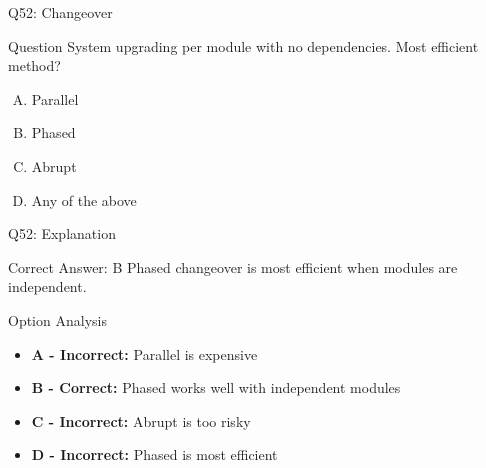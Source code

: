 \documentclass{beamer}
\begin{document}
	\begin{frame}{Q52:  Changeover}
		\begin{block}{Question}
			System upgrading per module with no dependencies. Most efficient method?
		\end{block}
		\begin{enumerate}[(A)]
			\item Parallel
			\item Phased
			\item Abrupt
			\item Any of the above
		\end{enumerate}
	\end{frame}
	
	\begin{frame}{Q52: Explanation}
		\begin{block}{Correct Answer: B}
			Phased changeover is most efficient when modules are independent.
		\end{block}
		\begin{block}{Option Analysis}
			\begin{itemize}
				\item \textbf{A - Incorrect:} Parallel is expensive
				\item \textbf{B - Correct:} Phased works well with independent modules
				\item \textbf{C - Incorrect:} Abrupt is too risky
				\item \textbf{D - Incorrect:} Phased is most efficient
			\end{itemize}
		\end{block}
	\end{frame}
	
\end{document}
